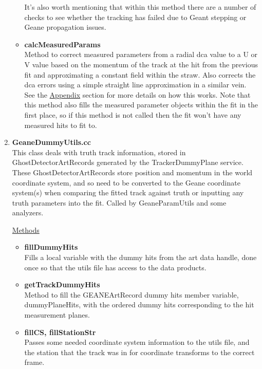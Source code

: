 \begin{enumerate}
\begin{itemize}
          It's also worth mentioning that within this method there are a number of checks to see whether the tracking has failed due to Geant stepping or Geane propagation issues.

          \item{\bf{calcMeasuredParams}} \\ 
          Method to correct measured parameters from a radial dca value to a U or V value based on the momentum of the track at the hit from the previous fit and approximating a constant field within the straw. Also corrects the dca errors using a simple straight line approximation in a similar vein. See the \hyperref[sec:Appendix]{Appendix} section for more details on how this works. Note that this method also fills the measured parameter objects within the fit in the first place, so if this method is not called then the fit won't have any measured hits to fit to.

        \end{itemize}

      \item{\bf{GeaneDummyUtils.cc}} \\
      This class deals with truth track information, stored in GhostDetectorArtRecords generated by the TrackerDummyPlane service. These GhostDetectorArtRecords store position and momentum in the world coordinate system, and so need to be converted to the Geane coordinate system(s) when comparing the fitted track against truth or inputting any truth parameters into the fit. Called by GeaneParamUtils and some analyzers.

      \underline{Methods}

        \begin{itemize}

          \item{\bf{fillDummyHits}} \\
          Fills a local variable with the dummy hits from the art data handle, done once so that the utils file has access to the data products.

          \item{\bf{getTrackDummyHits}} \\
          Method to fill the GEANEArtRecord dummy hits member variable, dummyPlaneHits, with the ordered dummy hits corresponding to the hit measurement planes.

          \item{\bf{fillCS, fillStationStr}} \\
          Passes some needed coordinate system information to the utils file, and the station that the track was in for coordinate transforms to the correct frame.


\end{itemize}
\end{enumerate}
